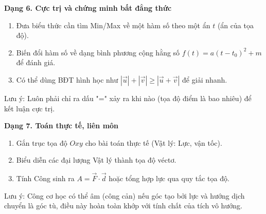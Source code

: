 \textbf{Dạng 6. Cực trị và chứng minh bất đẳng thức}
\begin{enumerate}
\item Đưa biểu thức cần tìm Min/Max về một hàm số theo một ẩn $t$ (ẩn của tọa độ).
\item Biến đổi hàm số về dạng bình phương cộng hằng số $f(t) = a(t - t_0)^2 + m$ để đánh giá.
\item Có thể dùng BĐT hình học như $|\overrightarrow{u}| + |\overrightarrow{v}| \ge |\overrightarrow{u} + \overrightarrow{v}|$ để giải nhanh.
\end{enumerate}
Lưu ý: Luôn phải chỉ ra dấu "=" xảy ra khi nào (tọa độ điểm là bao nhiêu) để kết luận cực trị.

\textbf{Dạng 7. Toán thực tế, liên môn}
\begin{enumerate}
\item Gắn trục tọa độ $Oxy$ cho bài toán thực tế (Vật lý: Lực, vận tốc).
\item Biểu diễn các đại lượng Vật lý thành tọa độ véctơ.
\item Tính Công sinh ra $A = \overrightarrow{F} \cdot \overrightarrow{d}$ hoặc tổng hợp lực qua quy tắc tọa độ.
\end{enumerate}
Lưu ý: Công cơ học có thể âm (công cản) nếu góc tạo bởi lực và hướng dịch chuyển là góc tù, điều này hoàn toàn khớp với tính chất của tích vô hướng.

